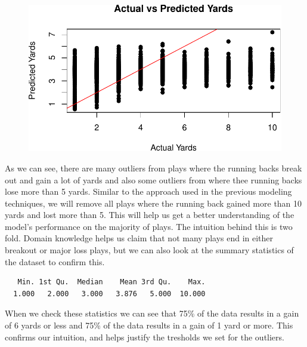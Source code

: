 \documentclass[
  super,
  preprint,
  3p]{elsarticle}
\newenvironment{Shaded}{\begin{snugshade}}{\end{snugshade}}
\newcommand{\FunctionTok}[1]{\textcolor[rgb]{0.28,0.35,0.67}{#1}}
\newcommand{\NormalTok}[1]{\textcolor[rgb]{0.00,0.23,0.31}{#1}}
\newcommand{\SpecialCharTok}[1]{\textcolor[rgb]{0.37,0.37,0.37}{#1}}
\begin{document}
\begin{figure}[H]

{\centering \includegraphics{project_report_files/figure-pdf/unnamed-chunk-10-1.pdf}

}

\end{figure}

As we can see, there are many outliers from plays where the running
backs break out and gain a lot of yards and also some outliers from
where thee running backs lose more than 5 yards. Similar to the approach
used in the previous modeling techniques, we will remove all plays where
the running back gained more than 10 yards and lost more than 5. This
will help us get a better understanding of the model's performance on
the majority of plays. The intuition behind this is two fold. Domain
knowledge helps us claim that not many plays end in either breakout or
major loss plays, but we can also look at the summary statistics of the
dataset to confirm this.

\begin{Shaded}
\end{Shaded}

\begin{verbatim}
   Min. 1st Qu.  Median    Mean 3rd Qu.    Max. 
  1.000   2.000   3.000   3.876   5.000  10.000 
\end{verbatim}

When we check these statistics we can see that 75\% of the data results
in a gain of 6 yards or less and 75\% of the data results in a gain of 1
yard or more. This confirms our intuition, and helps justify the
tresholds we set for the outliers.
\end{document}
